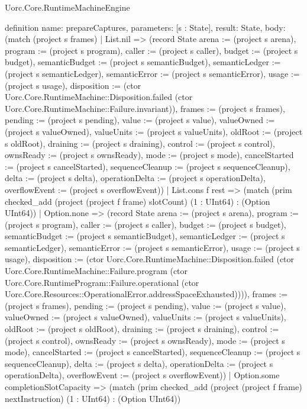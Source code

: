 \begin{lexlean}{Uorc.Core.RuntimeMachineEngine}
\begin{semanticmodule}
definition{
  name: prepareCaptures,
  parameters: [s : State],
  result: State,
  body: (match (project s frames)
    | List.nil => (record State {arena := (project s arena), program := (project s program), caller := (project s caller), budget := (project s budget), semanticBudget := (project s semanticBudget), semanticLedger := (project s semanticLedger), semanticError := (project s semanticError), usage := (project s usage), disposition := (ctor Uorc.Core.RuntimeMachine::Disposition.failed (ctor Uorc.Core.RuntimeMachine::Failure.invariant)), frames := (project s frames), pending := (project s pending), value := (project s value), valueOwned := (project s valueOwned), valueUnits := (project s valueUnits), oldRoot := (project s oldRoot), draining := (project s draining), control := (project s control), ownsReady := (project s ownsReady), mode := (project s mode), cancelStarted := (project s cancelStarted), sequenceCleanup := (project s sequenceCleanup), delta := (project s delta), operationDelta := (project s operationDelta), overflowEvent := (project s overflowEvent)})
    | List.cons f rest => (match (prim checked_add (project (project f frame) slotCount) (1 : UInt64) : (Option UInt64))
      | Option.none => (record State {arena := (project s arena), program := (project s program), caller := (project s caller), budget := (project s budget), semanticBudget := (project s semanticBudget), semanticLedger := (project s semanticLedger), semanticError := (project s semanticError), usage := (project s usage), disposition := (ctor Uorc.Core.RuntimeMachine::Disposition.failed (ctor Uorc.Core.RuntimeMachine::Failure.program (ctor Uorc.Core.RuntimeProgram::Failure.operational (ctor Uorc.Core.Resources::OperationalError.addressSpaceExhausted)))), frames := (project s frames), pending := (project s pending), value := (project s value), valueOwned := (project s valueOwned), valueUnits := (project s valueUnits), oldRoot := (project s oldRoot), draining := (project s draining), control := (project s control), ownsReady := (project s ownsReady), mode := (project s mode), cancelStarted := (project s cancelStarted), sequenceCleanup := (project s sequenceCleanup), delta := (project s delta), operationDelta := (project s operationDelta), overflowEvent := (project s overflowEvent)})
      | Option.some completionSlotCapacity => (match (prim checked_add (project (project f frame) nextInstruction) (1 : UInt64) : (Option UInt64))
}
\end{semanticmodule}
\end{lexlean}
